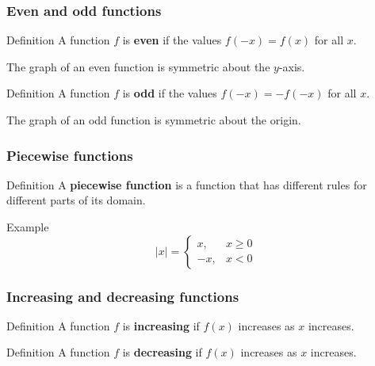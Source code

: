 \documentclass[t]{beamer}
\begin{document}
\begin{frame}
\frametitle{Even and odd functions}
\begin{block}{Definition}
A function $f$ is \textbf{even} if the values $f(-x) = f(x)$ for all $x$.
\end{block}
The graph of an even function is symmetric about the $y$-axis.
\begin{block}{Definition}
A function $f$ is \textbf{odd} if the values $f(-x) = -f(-x)$ for all $x$.
\end{block}
The graph of an odd function is symmetric about the origin.
\end{frame}

\begin{frame}
\frametitle{Piecewise functions}
\begin{block}{Definition}
A \textbf{piecewise function} is a function that has different rules for different parts of its domain.
\end{block}
\begin{block}{Example}
$$
|x| = \begin{cases}
x, & x \ge 0 \\
-x, &  x < 0
\end{cases}
$$
\end{block}
\end{frame}


\begin{frame}
\frametitle{Increasing and decreasing functions}
\begin{block}{Definition}
A function $f$ is \textbf{increasing} if $f(x)$ increases as $x$ increases.
\end{block}
\begin{block}{Definition}
A function $f$ is \textbf{decreasing} if $f(x)$ increases as $x$ increases.
\end{block}
\end{frame}
\end{document}
